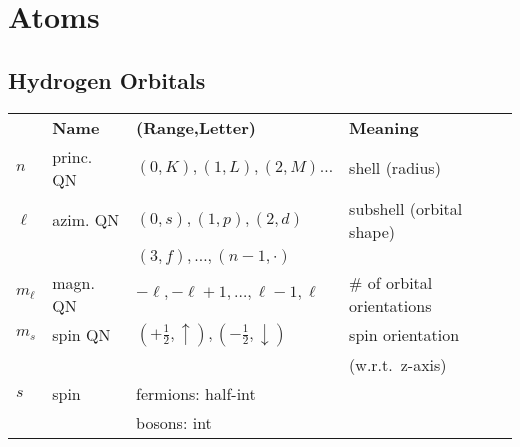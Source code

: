 \section{Atoms}
\subsection{Hydrogen Orbitals}
\renewcommand{\arraystretch}{1.1}
\setlength{\oldtabcolsep}{\tabcolsep}\setlength\tabcolsep{2pt}
{\small     %
    \begin{tabularx}{\linewidth}{@{}ll>{\footnotesize}lX@{}}
                 & \textbf{Name} & \textbf{(Range,Letter)}                             & \textbf{Meaning}           \\
        $n$      & princ. QN     & $(0,K),(1,L),(2,M)\dots$                            & shell (radius)             \\
        $\ell$   & azim. QN      & $(0,s),(1,p),(2,d)$                                 & subshell (orbital shape)   \\
                 &               & $(3,f),\ldots,(n-1,\cdot)$                          &                            \\
        $m_\ell$ & magn. QN      & $-\ell,-\ell+1,\dots,\ell-1,\ell$                   & \# of orbital orientations \\
        $m_s$    & spin QN       & $(+\frac{1}{2},\uparrow),(-\frac{1}{2},\downarrow)$ & spin orientation           \\
                 &               &                                                     & (w.r.t.\ z-axis)           \\
        $s$      & spin          & fermions: half-int                                  &                            \\
                 &               & bosons: int                                         &
    \end{tabularx}
}           %
\renewcommand{\arraystretch}{1}
\setlength{\tabcolsep}{\oldtabcolsep}
